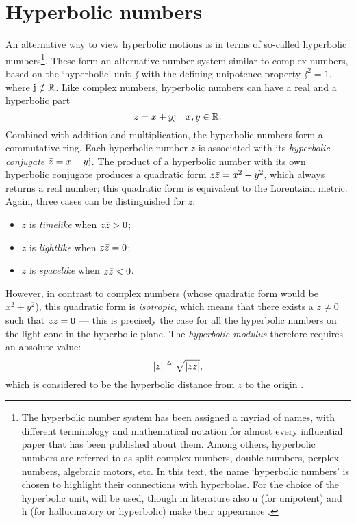\section{Hyperbolic numbers}
\label{sec:hyperbolic_numbers}
An alternative way to view hyperbolic motions is in terms of so-called hyperbolic numbers\footnote{The hyperbolic number system has been assigned a myriad of names, with different terminology and mathematical notation for almost every influential paper that has been published about them. Among others, hyperbolic numbers are referred to as split-complex numbers, double numbers, perplex numbers, algebraic motors, etc. In this text, the name `hyperbolic numbers' is chosen to highlight their connections with hyperbolae. For the choice of the hyperbolic unit,  will be used, though in literature also \(\mathrm{u}\) (for unipotent) and \(\mathrm{h}\) (for hallucinatory or hyperbolic) make their appearance \cite{Fjelstad1986, Sobczyk1995, Motter1998, Harkin2004}.}. These form an alternative number system similar to complex numbers, based on the `hyperbolic' unit \(\jj\) with the defining unipotence property \(\jj^2 = 1\), where \(\mathrm{j} \notin \mathbb{R}\). Like complex numbers, hyperbolic numbers can have a real and a hyperbolic part
\[
     z = x + y\mathrm{j} \quad x, y \in \mathbb{R}.
\]
Combined with addition and multiplication, the hyperbolic numbers form a commutative ring. Each hyperbolic number \(z\) is associated with its \emph{hyperbolic conjugate} \(\bar{z} = x - y\mathrm{j}\). The product of a hyperbolic number with its own hyperbolic conjugate produces a quadratic form \(z\bar{z} = x^2 - y^2\), which always returns a real number; this quadratic form is equivalent to the Lorentzian metric. Again, three cases can be distinguished for \(z\):
\begin{itemize}[topsep=0.3ex,itemsep=0.3ex]
    \item $z$ is \emph{timelike} when \(z\bar{z} > 0\);
    \item $z$ is \emph{lightlike} when \(z\bar{z} = 0\);
    \item $z$ is \emph{spacelike} when \(z\bar{z} < 0\).
\end{itemize}
However, in contrast to complex numbers (whose quadratic form would be \(x^2 + y^2\)), this quadratic form is \emph{isotropic}, which means that there exists a \(z \neq 0\) such that \(z\bar{z} = 0\) --- this is precisely the case for all the hyperbolic numbers on the light cone in the hyperbolic plane. The \emph{hyperbolic modulus} therefore requires an absolute value:
\[
    \abs{z} \triangleq \sqrt{\abs{z\bar{z}}},
\]
which is considered to be the hyperbolic distance from \(z\) to the origin \cite{Sobczyk1995}.

